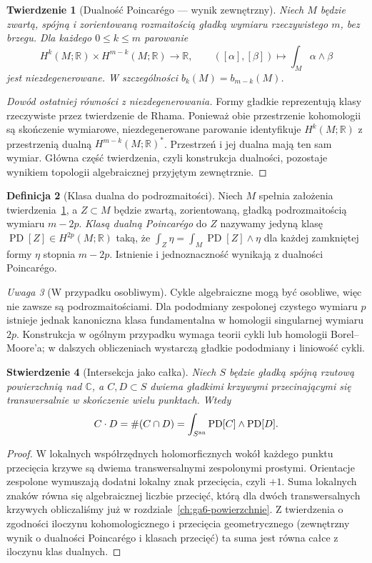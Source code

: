 \documentclass[11pt,a4paper,openany]{report}
\numberwithin{equation}{section}
\theoremstyle{plain}
\newtheorem{twierdzenie}{Twierdzenie}[section]
\newtheorem{stwierdzenie}[twierdzenie]{Stwierdzenie}
\theoremstyle{definition}
\newtheorem{definicja}[twierdzenie]{Definicja}
\theoremstyle{remark}
\newtheorem{uwaga}[twierdzenie]{Uwaga}
\newcommand{\R}{\mathbb R}
\newcommand{\C}{\mathbb C}
\begin{document}
\begin{twierdzenie}[Dualność Poincarégo — wynik zewnętrzny]
\label{tw:ga10-pd}
Niech $M$ będzie zwartą, spójną i zorientowaną rozmaitością
gładką wymiaru rzeczywistego $m$, bez brzegu.
Dla każdego $0\le k\le m$ parowanie
\[
 H^k(M;\R)\times H^{m-k}(M;\R)\longrightarrow\R,
 \qquad ([\alpha],[\beta])\longmapsto\int_M\alpha\wedge\beta
\]
jest niezdegenerowane. W szczególności $b_k(M)=b_{m-k}(M)$.
\end{twierdzenie}

\begin{proof}[Dowód ostatniej równości z niezdegenerowania]
Formy gładkie reprezentują klasy rzeczywiste przez twierdzenie
de Rhama. Ponieważ obie przestrzenie kohomologii są skończenie
wymiarowe, niezdegenerowane parowanie identyfikuje
$H^k(M;\R)$ z przestrzenią dualną $H^{m-k}(M;\R)^*$.
Przestrzeń i jej dualna mają ten sam wymiar.
Główna część twierdzenia, czyli konstrukcja dualności,
pozostaje wynikiem topologii algebraicznej przyjętym zewnętrznie.
\end{proof}

\begin{definicja}[Klasa dualna do podrozmaitości]
Niech $M$ spełnia założenia twierdzenia~\ref{tw:ga10-pd},
a $Z\subset M$ będzie zwartą, zorientowaną, gładką
podrozmaitością wymiaru $m-2p$.
\emph{Klasą dualną Poincarégo} do $Z$ nazywamy
jedyną klasę $\operatorname{PD}[Z]\in H^{2p}(M;\R)$ taką, że
$\int_Z\eta=\int_M\operatorname{PD}[Z]\wedge\eta$
dla każdej zamkniętej formy $\eta$ stopnia $m-2p$.
Istnienie i jednoznaczność wynikają z dualności Poincarégo.
\end{definicja}

\begin{uwaga}[W przypadku osobliwym]
Cykle algebraiczne mogą być osobliwe, więc nie zawsze są
podrozmaitościami. Dla pododmiany zespolonej czystego wymiaru
$p$ istnieje jednak kanoniczna klasa fundamentalna w homologii
singularnej wymiaru $2p$. Konstrukcja w ogólnym przypadku
wymaga teorii cykli lub homologii Borel–Moore'a; w dalszych
obliczeniach wystarczą gładkie pododmiany i liniowość cykli.
\end{uwaga}

\begin{stwierdzenie}[Intersekcja jako całka]
\label{st:ga10-intersection}
Niech $S$ będzie gładką spójną rzutową powierzchnią nad $\C$,
a $C,D\subset S$ dwiema gładkimi krzywymi przecinającymi się
transwersalnie w skończenie wielu punktach. Wtedy
\[
 C\cdot D=\#(C\cap D)
 =\int_{S^{\rm an}}\operatorname{PD}[C]\wedge\operatorname{PD}[D].
\]
\end{stwierdzenie}
\begin{proof}
W lokalnych współrzędnych holomorficznych wokół każdego
punktu przecięcia krzywe są dwiema transwersalnymi
zespolonymi prostymi. Orientacje zespolone wymuszają dodatni
lokalny znak przecięcia, czyli $+1$. Suma lokalnych znaków
równa się algebraicznej liczbie przecięć, którą dla dwóch
transwersalnych krzywych obliczaliśmy już w
rozdziale~\ref{ch:ga6-powierzchnie}. Z twierdzenia o zgodności
iloczynu kohomologicznego i przecięcia geometrycznego
(zewnętrzny wynik o dualności Poincarégo i klasach przecięć) ta suma jest
równa całce z iloczynu klas dualnych.
\end{proof}
\end{document}
